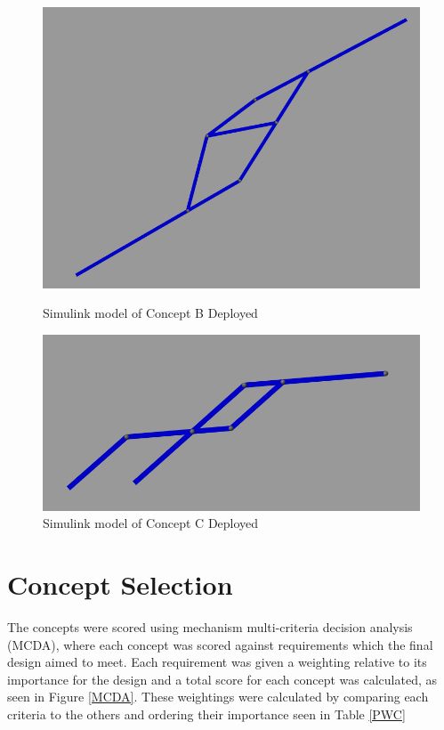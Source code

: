 \documentclass[a4paper]{article}
\begin{document}
\begin{figure}[H]
    \centering
\begin{minipage}[b]{0.4\textwidth}
    \centering
    \includegraphics[width=1\textwidth]{TerryDep.PNG}
    \caption{\label{DeployedB} Simulink model of Concept B Deployed}
  \end{minipage}
\hfill
   \begin{minipage}[b]{0.4\textwidth}
     \centering
    \includegraphics[width=1\textwidth]{StuartDep.PNG}
    \centering
    \caption{\label{DeployedC} Simulink model of Concept C Deployed}
  \end{minipage}
\end{figure}

\section{Concept Selection}
The concepts were scored using mechanism multi-criteria decision analysis (MCDA), where each concept was scored against requirements which the final design aimed to meet. Each requirement was given a weighting relative to its importance for the design and a total score for each concept was calculated, as seen in Figure \ref{MCDA}. These weightings were calculated by comparing each criteria to the others and ordering their importance seen in Table \ref{PWC}
\end{document}
